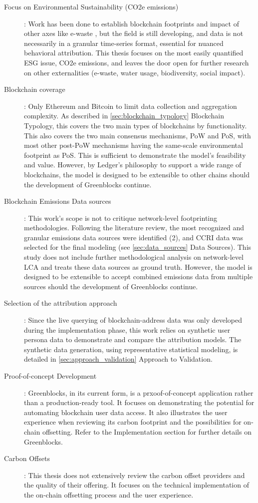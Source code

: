 \documentclass[11pt]{report}
\begin{document}
\begin{description}
    \item [Focus on Environmental Sustainability (CO2e emissions)]: Work has been done to establish blockchain footprints and impact of other axes like e-waste \cite{devriesBitcoinGrowingEwaste2021}, but the field is still developing, and data is not necessarily in a granular time-series format, essential for nuanced behavioral attribution. This thesis focuses on the most easily quantified \ac{ESG} issue, CO2e emissions, and leaves the door open for further research on other externalities (e-waste, water usage, biodiversity, social impact).
    \item [Blockchain coverage]: Only Ethereum and Bitcoin to limit data collection and aggregation complexity. As described in \ref{sec:blockchain_typology} Blockchain Typology, this covers the two main types of blockchains by functionality. This also covers the two main consensus mechanisms, \ac{PoW} and \ac{PoS}, with most other post-PoW mechanisms having the same-scale environmental footprint as PoS. This is sufficient to demonstrate the model's feasibility and value. However, by Ledger's philosophy to support a wide range of blockchains, the model is designed to be extensible to other chains should the development of Greenblocks continue.
    \item [Blockchain Emissions Data sources]: This work's scope is not to critique network-level footprinting methodologies. Following the literature review, the most recognized and granular emissions data sources were identified (2), and \ac{CCRI} data was selected for the final modeling (see \ref{sec:data_sources} Data Sources). This study does not include further methodological analysis on network-level LCA and treats these data sources as ground truth. However, the model is designed to be extensible to accept combined emissions data from multiple sources should the development of Greenblocks continue.
    \item [Selection of the attribution approach]: Since the live querying of blockchain-address data was only developed during the implementation phase, this work relies on synthetic user persona data to demonstrate and compare the attribution models. The synthetic data generation, using representative statistical modeling, is detailed in \ref{sec:approach_validation} Approach to Validation.
    \item [Proof-of-concept Development]: Greenblocks, in its current form, is a prxoof-of-concept application rather than a production-ready tool. It focuses on demonstrating the potential for automating blockchain user data access. It also illustrates the user experience when reviewing its carbon footprint and the possibilities for on-chain offsetting. Refer to the Implementation section for further details on Greenblocks.
    \item [Carbon Offsets]: This thesis does not extensively review the carbon offset providers and the quality of their offering. It focuses on the technical implementation of the on-chain offsetting process and the user experience.
\end{description}
\end{document}
